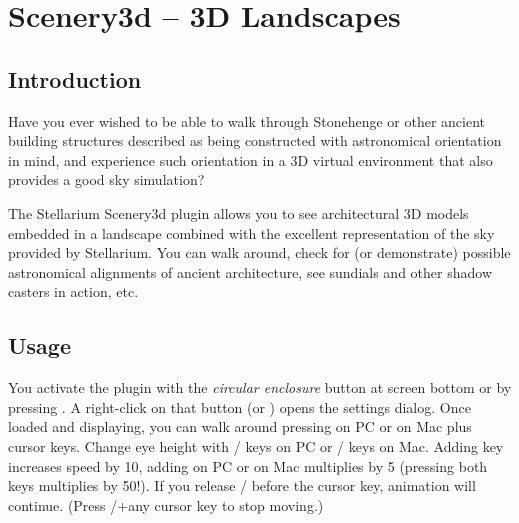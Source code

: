 
\chapter{Scenery3d -- 3D Landscapes}
\label{ch:scenery3d}


\section{Introduction}
\label{sec:scenery3d:Introduction}


Have you ever wished to be able to walk through Stonehenge or other
ancient building structures described as being constructed with
astronomical orientation in mind, and experience such orientation in a
3D virtual environment that also provides a good sky simulation?

The Stellarium Scenery3d plugin allows you to see architectural 3D models
embedded in a landscape combined with the excellent representation of the sky
provided by Stellarium. You can walk around, check for (or
demonstrate) possible astronomical alignments of ancient architecture, see
sundials and other shadow casters in action, etc.

\section{Usage}
\label{sec:scenery3d:Usage}


You activate the plugin with the \emph{circular enclosure} button  at screen
bottom or by pressing . A right-click on that button  (or )
opens the settings dialog. Once loaded and
displaying, you can walk around pressing \key{\ctrl} on PC or  on Mac plus cursor keys. Change eye
height with / keys on PC or / keys on Mac. Adding \key{\shift} key increases speed by 10,
adding \key{\Alt} on PC or  on Mac multiplies by 5 (pressing both keys multiplies by 50!). If you release \key{\ctrl}/ before
the cursor key, animation will continue. (Press \key{\ctrl}/+any cursor key to stop
moving.)

